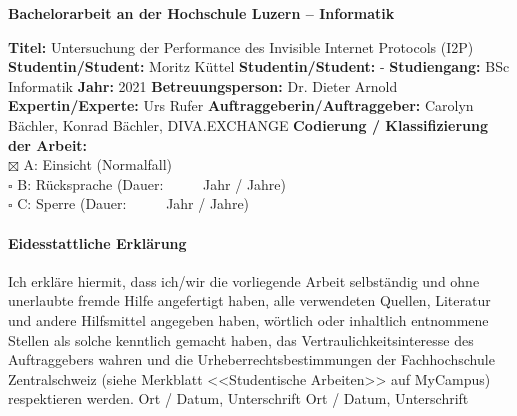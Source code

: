 \vspace*{1.35cm}

\fontsize{12}{14}
\textbf{Bachelorarbeit an der Hochschule Luzern -- Informatik} \\ \vspace*{0.6cm}

\fontsize{10.5}{12}
\noindent
\textbf{Titel:} Untersuchung der Performance des Invisible Internet Protocols (I2P)\newline \newline
\textbf{Studentin/Student:} Moritz Küttel \newline \newline
\textbf{Studentin/Student:} - \newline \newline
\textbf{Studiengang:} BSc Informatik \newline \newline
\textbf{Jahr:} 2021\newline \newline
\textbf{Betreuungsperson:} Dr. Dieter Arnold \newline \newline
\textbf{Expertin/Experte:} Urs Rufer \newline \newline
\textbf{Auftraggeberin/Auftraggeber:} Carolyn Bächler, Konrad Bächler, DIVA.EXCHANGE\newline \newline \newline
\textbf{Codierung / Klassifizierung der Arbeit:}\\
$\boxtimes$ A: Einsicht   (Normalfall) \\
$\square$ B: R\"ucksprache      (Dauer:  \ \ \ \ \     Jahr / Jahre)\\
$\square$ C: Sperre     (Dauer:  \ \ \ \ \     Jahr / Jahre)\\

\paragraph{\textbf{Eidesstattliche Erkl\"arung}}
Ich erkl\"are hiermit, dass ich/wir die vorliegende Arbeit selbst\"andig und ohne unerlaubte fremde Hilfe angefertigt haben, alle verwendeten Quellen, Literatur und andere Hilfsmittel angegeben haben, w\"ortlich oder inhaltlich entnommene Stellen als solche kenntlich gemacht haben, das Vertraulichkeitsinteresse des Auftraggebers wahren und die Urheberrechtsbestimmungen der Fachhochschule Zentralschweiz (siehe Merkblatt <<Studentische Arbeiten>> auf MyCampus) respektieren werden. \newline \newline
Ort / Datum, Unterschrift       \underline{\hspace*{4cm}} \newline \newline
Ort / Datum, Unterschrift       \underline{\hspace*{4cm}}


